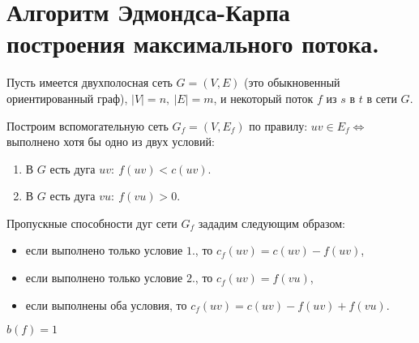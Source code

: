 \section{Алгоритм Эдмондса-Карпа построения максимального потока.}

\begin{note}
    Пусть имеется двухполосная сеть $ G = (V,E) $ (это обыкновенный ориентированный граф), $ | V | = n, \ | E | = m $, и некоторый поток $ f $ из $ s $ в $ t $ в сети $ G $.

    Построим вспомогательную сеть $ G_f = (V,E_f) $ по правилу: $ uv \in E_f \iff $ выполнено хотя бы одно из двух условий:
    \begin{enumerate}
        \item В $ G $ есть дуга $ uv: \ f(uv) < c(uv) $.
        \item В $ G $ есть дуга $ vu: \ f(vu) > 0 $.
    \end{enumerate}

    Пропускные способности дуг сети $ G_f $ зададим следующим образом:
    \begin{itemize}
        \item если выполнено только условие $ 1. $, то $ c_f(uv) = c(uv) - f(uv) $,
        \item если выполнено только условие $ 2. $, то $ c_f(uv) = f(vu) $,
        \item если выполнены оба условия, то $ c_f(uv) = c(uv) - f(uv) + f(vu) $.
    \end{itemize}
\end{note}

\begin{example}
    $ b(f) = 1$
    \begin{figure}[H]
        \centering
        \label{fig:fig_32}
    \end{figure}
\end{example}
